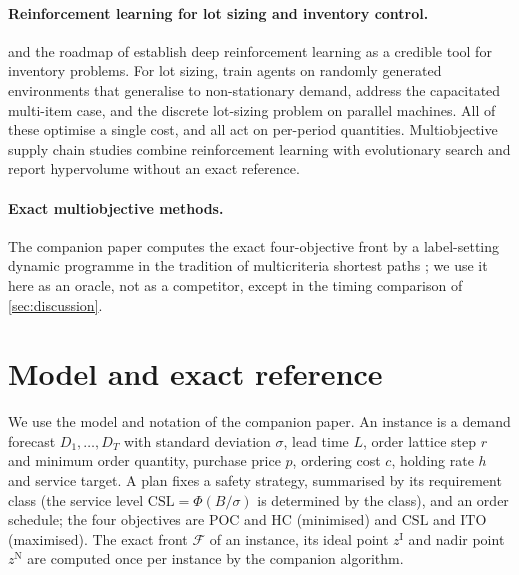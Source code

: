 \documentclass[preprint,12pt,authoryear]{elsarticle}
\newcommand{\POC}{\mathrm{POC}}\newcommand{\HC}{\mathrm{HC}}\newcommand{\CSL}{\mathrm{CSL}}\newcommand{\ITO}{\mathrm{ITO}}
\begin{document}
\paragraph{Reinforcement learning for lot sizing and inventory control.}
\citet{Gijsbrechts2022MSOM} and the roadmap of \citet{Boute2022Roadmap} establish deep
reinforcement learning as a credible tool for inventory problems. For lot sizing,
\citet{Dehaybe2024} train agents on randomly generated environments that generalise to
non-stationary demand, \citet{vanHezewijk2023,vanHezewijk2025} address the capacitated multi-item
case, and \citet{Felizardo2024} the discrete lot-sizing problem on parallel machines. All of these
optimise a single cost, and all act on per-period quantities. Multiobjective supply chain studies
\citep{Kotecha2025MORSE,Rachman2025} combine reinforcement learning with evolutionary search and
report hypervolume without an exact reference.

\paragraph{Exact multiobjective methods.}
The companion paper computes the exact four-objective front by a label-setting dynamic programme
in the tradition of multicriteria shortest paths \citep{Martins1984,SedenoNoda2019,Maristany2021};
we use it here as an oracle, not as a competitor, except in the timing comparison of
\cref{sec:discussion}.

\section{Model and exact reference}\label{sec:model}

We use the model and notation of the companion paper. An instance is a demand forecast
$D_1,\dots,D_T$ with standard deviation $\sigma$, lead time $L$, order lattice step $r$ and
minimum order quantity, purchase price $p$, ordering cost $c$, holding rate $h$ and service
target. A plan fixes a safety strategy, summarised by its requirement class (the service level
$\CSL=\Phi(B/\sigma)$ is determined by the class), and an order schedule; the four objectives are
$\POC$ and $\HC$ (minimised) and $\CSL$ and $\ITO$ (maximised). The exact front $\mathcal{F}$ of
an instance, its ideal point $z^{\mathrm{I}}$ and nadir point $z^{\mathrm{N}}$ are computed once
per instance by the companion algorithm.
\end{document}
